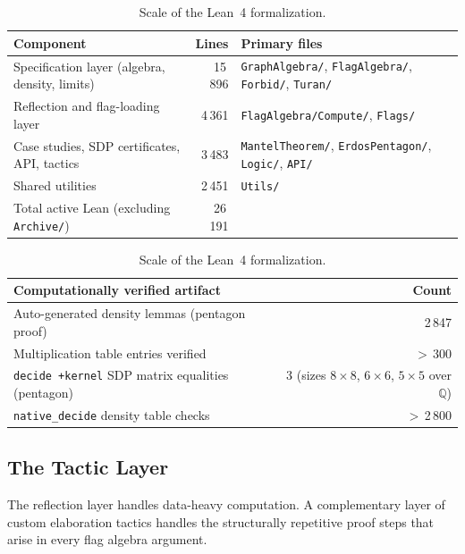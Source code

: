 \documentclass{article}
\newcommand{\Q}{\mathbb{Q}}
\newcommand{\lean}[1]{\texttt{#1}}
\begin{document}
\begin{table}
  \small
  \caption{Scale of the Lean~4 formalization.}
  \label{tab:metrics}
  \begin{tabular}{lrl}
    \toprule
    Component & Lines & Primary files \\
    \midrule
    Specification layer (algebra, density, limits) & 15\,896 &
      \lean{GraphAlgebra/}, \lean{FlagAlgebra/}, \lean{Forbid/}, \lean{Turan/} \\
    Reflection and flag-loading layer & 4\,361 &
      \lean{FlagAlgebra/Compute/}, \lean{Flags/} \\
    Case studies, SDP certificates, API, tactics & 3\,483 &
      \lean{MantelTheorem/}, \lean{ErdosPentagon/}, \lean{Logic/}, \lean{API/} \\
    Shared utilities & 2\,451 &
      \lean{Utils/} \\
    \midrule
    Total active Lean (excluding \lean{Archive/}) & 26\,191 & \\
    \bottomrule
  \end{tabular}

  \medskip
  \begin{tabular}{lr}
    \toprule
    Computationally verified artifact & Count \\
    \midrule
    Auto-generated density lemmas (pentagon proof) & 2\,847 \\
    Multiplication table entries verified & $>$\,300 \\
    \lean{decide~+kernel} SDP matrix equalities (pentagon) &
      3 (sizes $8{\times}8$, $6{\times}6$, $5{\times}5$ over $\Q$) \\
    \lean{native\_decide} density table checks & $>$\,2\,800 \\
    \bottomrule
  \end{tabular}
\end{table}

\subsection{The Tactic Layer}
\label{sec:tactics}

The reflection layer handles data-heavy computation.  A complementary layer
of custom elaboration tactics handles the structurally repetitive proof
steps that arise in every flag algebra argument.
\end{document}
